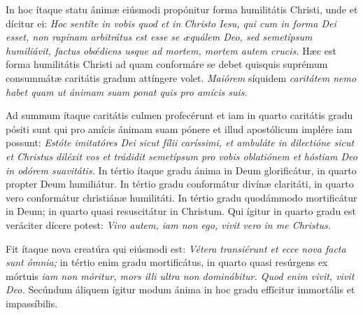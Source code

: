 {\noindent In hoc ítaque statu ánimæ eiúsmodi propónitur forma humilitátis Christi, unde et dícitur ei: \textit{Hoc sentíte in vobis quod et in Christo Iesu, qui cum in forma Dei esset, non rapínam arbitrátus est esse se æquálem Deo, sed semetípsum humiliávit, factus obœ́diens usque ad mortem, mortem autem crucis.} Hæc est forma humilitátis Christi ad quam conformáre se debet quisquis suprémum consummátæ caritátis gradum attíngere volet. \textit{Maiórem} síquidem \textit{caritátem nemo habet quam ut ánimam suam ponat quis pro amícis suis.}

\noindent Ad summum ítaque caritátis culmen profecérunt et iam in quarto caritátis gradu pósiti sunt qui pro amícis ánimam suam pónere et illud apostólicum implére iam possunt: \textit{Estóte imitatóres Dei sicut fílii caríssimi, et ambuláte in dilectióne sicut et Christus diléxit vos et trádidit semetípsum pro vobis oblatiónem et hóstiam Deo in odórem suavitátis.} In tértio ítaque gradu ánima in Deum glorificátur, in quarto propter Deum humiliátur. In tértio gradu conformátur divínæ claritáti, in quarto vero conformátur christiánæ humilitáti. In tértio gradu quodámmodo mortificátur in Deum; in quarto quasi resuscitátur in Christum. Qui ígitur in quarto gradu est veráciter dícere potest: \textit{Vivo autem, iam non ego, vivit vero in me Christus.}

\noindent Fit ítaque nova creatúra qui eiúsmodi est: \textit{Vétera transiérunt et ecce nova facta sunt ómnia;} in tértio enim gradu mortificátus, in quarto quasi resúrgens ex mórtuis \textit{iam non móritur, mors illi ultra non dominábitur. Quod enim vivit, vivit Deo.} Secúndum áliquem ígitur modum ánima in hoc gradu effícitur immortális et impassíbilis.

\vfill
\pagebreak

 

\vspace{-5mm}


\vfill
\pagebreak
}
\newcommand{\benedictus}{\pars{Canticum Zachariæ.} \scriptura{Mc. 9, 40}

\vspace{-4mm}

\antiphona{VIII G}{temporalia/ant-quienimnonest.gtex}

\vspace{-2mm}

\scriptura{Lc. 1, 68-79}

\vspace{-2mm}

\cantusSineNeumas
\initiumpsalmi{temporalia/benedictus-initium-viiisoll-G-auto.gtex}


 \Abardot{}}


